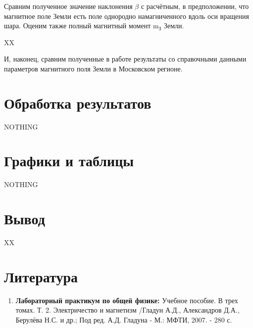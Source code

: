 \documentclass[a4paper, 12pt]{article}%
\begin{document}
Сравним полученное значение наклонения $\beta$ с расчётным, в предположении, что магнитное поле Земли есть поле однородно намагниченного вдоль оси вращения шара. Оценим также полный магнитный
момент $\mathrm{m}_{\text{З}}$ Земли.

XX

И, наконец, сравним полученные в работе результаты со справочными данными параметров магнитного поля Земли в Московском регионе.





\section{Обработка результатов}

NOTHING

\section{Графики и таблицы}

NOTHING

\section{Вывод}

XX

\section{Литература}

\begin{enumerate}
\item \textbf{Лабораторный практикум по общей физике:} Учебное пособие. В трех томах. Т. 2. Электричество и магнетизм /Гладун А.Д., Александров Д.А., Берулёва Н.С. и др.; Под ред. А.Д. Гладуна - М.: МФТИ, 2007. - 280 с.
\end{enumerate}		
		
\end{document}
